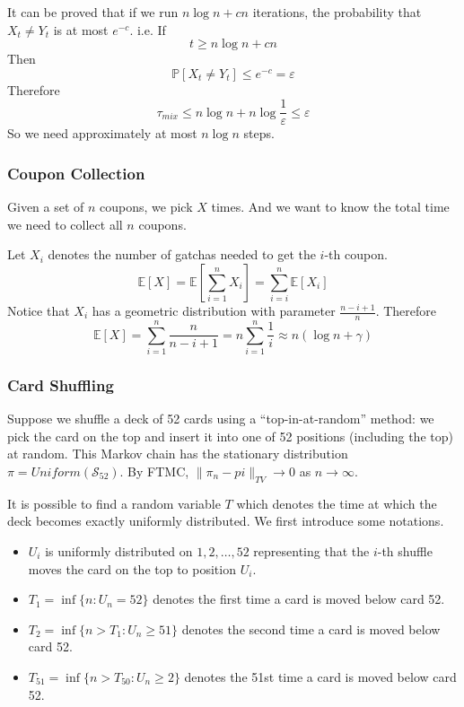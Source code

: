             It can be proved that if we run $n\log n + cn$ iterations, the probability that $X_t \neq Y_t$ is at most $e^{-c}$. i.e.
            If
            \[ t \ge n\log n + cn \]
            Then
            \[ \mathbb{P}[X_t \ne Y_t] \le e^{-c} = \varepsilon \]
            Therefore 
            \[ \tau_{mix} \le n\log n + n\log \frac{1}{\varepsilon} \le \varepsilon\]
            So we need approximately at most $n\log n$ steps.

        \subsubsection{Coupon Collection}
            Given a set of $n$ coupons, we pick $X$ times. And we want to know the total time we need to collect all $n$ coupons.

            Let $X_i$ denotes the number of gatchas needed to get the $i$-th coupon.
            \[ \mathbb{E}[X] = \mathbb{E}[\sum_{i=1}^n X_i] = \sum_{i=i}^n \mathbb{E}[X_i] \]
            Notice that $X_i$ has a geometric distribution with parameter $\frac{n-i+1}{n}$. Therefore
            \[ \mathbb{E}[X] = \sum_{i=1}^n \frac{n}{n-i+1} = n\sum_{i=1}^n \frac{1}{i} \approx n(\log n + \gamma) \]

        \subsubsection{Card Shuffling}
            Suppose we shuffle a deck of 52 cards using a ``top-in-at-random'' method: we pick the card on the top and insert it into one of 52 positions (including the top) at random. This Markov chain has the stationary distribution $\pi = Uniform(\mathcal{S}_{52})$. By FTMC, $\|\pi_n - pi\|_{TV} \to 0$ as $n \to \infty$.

            It is possible to find a random variable $T$ which denotes the time at which the deck becomes exactly uniformly distributed. We first introduce some notations.

            \begin{itemize}
                \item $U_i$ is uniformly distributed on $1,2,\dots,52$ representing that the $i$-th shuffle moves the card on the top to position $U_i$.
                \item $T_1 = \inf\{ n: U_n = 52 \}$ denotes the first time a card is moved below card 52.
                \item $T_2 = \inf\{ n>T_1: U_n \ge 51 \}$ denotes the second time a card is moved below card 52.
                \item $T_{51} = \inf\{ n>T_50: U_n \ge 2 \}$ denotes the 51st time a card is moved below card 52.
            \end{itemize}


